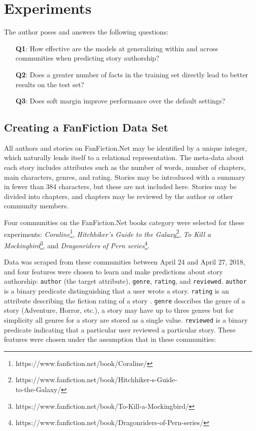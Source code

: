 \documentclass[letterpaper]{article}
\begin{document}
\section{Experiments}

The author poses and answers the following questions:

\begin{enumerate}
    \item[\textbf{Q1}:] How effective are the models at generalizing within and across communities when predicting story authorship?
    \item[\textbf{Q2}:] Does a greater number of facts in the training set directly lead to better results on the test set?
    \item[\textbf{Q3}:] Does soft margin improve performance over the default settings?
\end{enumerate}

\subsection{Creating a FanFiction Data Set}

All authors and stories on FanFiction.Net may be identified by a unique integer, which naturally lends itself to a relational representation. The meta-data about each story includes attributes such as the number of words, number of chapters, main characters, genres, and rating. Stories may be introduced with a summary in fewer than 384 characters, but these are not included here. Stories may be divided into chapters, and chapters may be reviewed by the author or other community members.

Four communities on the FanFiction.Net books category were selected for these experiments: \textit{Coraline}\footnote{https://www.fanfiction.net/book/Coraline/}, \textit{Hitchhiker's Guide to the Galaxy}\footnote{https://www.fanfiction.net/book/Hitchhiker-s-Guide-\\to-the-Galaxy/}, \textit{To Kill a Mockingbird}\footnote{https://www.fanfiction.net/book/To-Kill-a-Mockingbird/}, and \textit{Dragonriders of Pern series}\footnote{https://www.fanfiction.net/book/Dragonriders-of-Pern-series/}.

Data was scraped from these communities between April 24 and April 27, 2018, and four features were chosen to learn and make predictions about story authorship: \texttt{author} (the target attribute), \texttt{genre}, \texttt{rating}, and \texttt{reviewed}. \texttt{author} is a binary predicate distinguishing that a user wrote a story. \texttt{rating} is an attribute describing the fiction rating of a story \cite{fictionratings}. \texttt{genre} describes the genre of a story (Adventure, Horror, etc.), a story may have up to three genres but for simplicity all genres for a story are stored as a single value. \texttt{reviewed} is a binary predicate indicating that a particular user reviewed a particular story.  These features were chosen under the assumption that in these communities:
\end{document}
